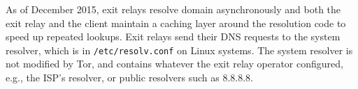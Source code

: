 As of December 2015, exit relays resolve domain asynchronously and both the exit
relay and the client maintain a caching layer around the resolution code to
speed up repeated lookups.  Exit relays send their DNS requests to the system
resolver, which is in \texttt{/etc/resolv.conf} on Linux systems.  The system
resolver is not modified by Tor, and contains whatever the exit relay operator
configured, e.g., the ISP's resolver, or public resolvers such as 8.8.8.8.
